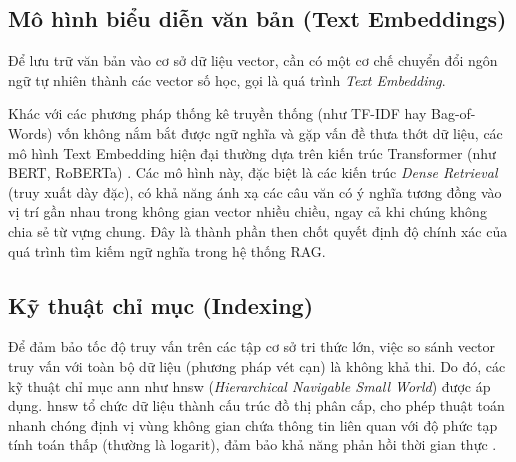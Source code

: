 \subsection{Mô hình biểu diễn văn bản (Text Embeddings)}
Để lưu trữ văn bản vào cơ sở dữ liệu vector, cần có một cơ chế chuyển đổi ngôn ngữ tự nhiên thành các vector số học, gọi là quá trình \textit{Text Embedding}.

Khác với các phương pháp thống kê truyền thống (như TF-IDF hay Bag-of-Words) vốn không nắm bắt được ngữ nghĩa và gặp vấn đề thưa thớt dữ liệu, các mô hình Text Embedding hiện đại thường dựa trên kiến trúc Transformer (như BERT, RoBERTa) \cite{reimers2019sentence}. Các mô hình này, đặc biệt là các kiến trúc \textit{Dense Retrieval} (truy xuất dày đặc), có khả năng ánh xạ các câu văn có ý nghĩa tương đồng vào vị trí gần nhau trong không gian vector nhiều chiều, ngay cả khi chúng không chia sẻ từ vựng chung. Đây là thành phần then chốt quyết định độ chính xác của quá trình tìm kiếm ngữ nghĩa trong hệ thống RAG.

\subsection{Kỹ thuật chỉ mục (Indexing)}
Để đảm bảo tốc độ truy vấn trên các tập cơ sở tri thức lớn, việc so sánh vector truy vấn với toàn bộ dữ liệu (phương pháp vét cạn) là không khả thi. Do đó, các kỹ thuật chỉ mục \gls{ann} như \gls{hnsw} (\textit{Hierarchical Navigable Small World}) được áp dụng. \Gls{hnsw} tổ chức dữ liệu thành cấu trúc đồ thị phân cấp, cho phép thuật toán nhanh chóng định vị vùng không gian chứa thông tin liên quan với độ phức tạp tính toán thấp (thường là logarit), đảm bảo khả năng phản hồi thời gian thực \cite{malkov2018efficient}.

